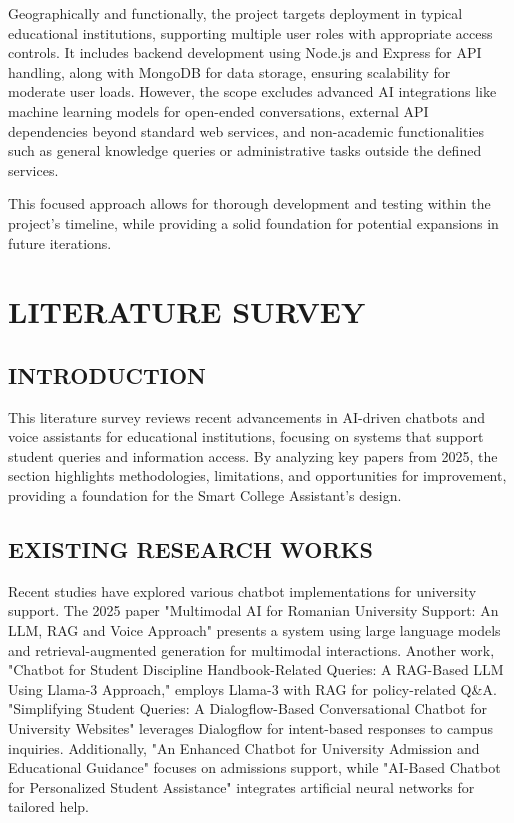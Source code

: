 \documentclass{article}
\begin{document}
Geographically and functionally, the project targets deployment in typical educational institutions, supporting multiple user roles with appropriate access controls. It includes backend development using Node.js and Express for API handling, along with MongoDB for data storage, ensuring scalability for moderate user loads. However, the scope excludes advanced AI integrations like machine learning models for open-ended conversations, external API dependencies beyond standard web services, and non-academic functionalities such as general knowledge queries or administrative tasks outside the defined services.

This focused approach allows for thorough development and testing within the project's timeline, while providing a solid foundation for potential expansions in future iterations.

\section{LITERATURE SURVEY}

\subsection{INTRODUCTION}
This literature survey reviews recent advancements in AI-driven chatbots and voice assistants for educational institutions, focusing on systems that support student queries and information access. By analyzing key papers from 2025, the section highlights methodologies, limitations, and opportunities for improvement, providing a foundation for the Smart College Assistant's design.

\subsection{EXISTING RESEARCH WORKS}
Recent studies have explored various chatbot implementations for university support. The 2025 paper "Multimodal AI for Romanian University Support: An LLM, RAG and Voice Approach" presents a system using large language models and retrieval-augmented generation for multimodal interactions. Another work, "Chatbot for Student Discipline Handbook-Related Queries: A RAG-Based LLM Using Llama-3 Approach," employs Llama-3 with RAG for policy-related Q&A. "Simplifying Student Queries: A Dialogflow-Based Conversational Chatbot for University Websites" leverages Dialogflow for intent-based responses to campus inquiries. Additionally, "An Enhanced Chatbot for University Admission and Educational Guidance" focuses on admissions support, while "AI-Based Chatbot for Personalized Student Assistance" integrates artificial neural networks for tailored help.
\end{document}
